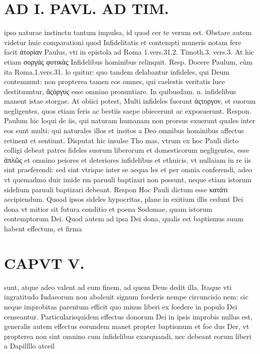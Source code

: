 \documentclass{article}
\begin{document}
\begin{pages}
\section*{AD I. PAVL. AD TIM. }
\marginpar{[ p.268 ]}\pstart ipso naturae instinctu tantum impulsa, id quod cer te verum est. Obstare autem videtur huic comparationi quod Infidelitatis et contempti muneris notam fere facit ἀτορίαν Paulus, vti in epistola ad Roma 1.vers.31.2. Timoth.3. vers.3. At hic etiam σοργάς φυτικὰς Infidelibus hominibus relinquit. Resp. Docere Paulum, cùm ita Roma.1.vers.31. lo quitur: quo tandem delabantur infideles, qui Deum contemnunt: non propterea tamen eos omnes, qui caelestis veritatis luce destituuntur, ἄςόργυς esse omnino pronuntiare. In quibusdam. n. infidelibus manent istae storgae. At obiici potest, Multi infideles fuerunt ἀςτοργον, et suorum negligentes, quos etiam feris ac bestiis saepe obiecerunt ac exposuerunt. Respon. Paulum hic loqui de iis, qui naturam humanam non prorsus exuerunt quales inter eos sunt multi: qui naturales illos et insitos a Deo omnibus hominibus affectus retinent et sentiunt. Disputat hic insulse Tho mas, vtrum ex hoc Pauli dicto colligi debeat patres fideles suorum liberorum et domesticorum negligentes, esse ἀπλῶς et omnino peiores et deteriores infidelibus et ethuicis, vt nullaiam in re iis sint praeferendi: sed sint vtrique inter se aequa les et per omnia conferendi, adeo vt quemadmo duir imide rm paruuli baptizari non possunt, neque etiam istorum sidelium paruuli baptizari debeant. Respon Hoc Pauli dictum esse κατάτι accipiendum. Quoad ipsos sideles hypocritas, plane in exitium illis cedunt Dei dona vt mitior sit futura conditio et poena Sodomae, quam istorum contemptorum Dei. Quod autem ad ipsa Dei dona, qualis est baptismus suum habent effectum, et firma  \pend
\section*{CAPVT  V. }
\marginpar{[ p.269 ]}\pstart sunt, atque adeo valent ad eum finem, ad quem Deus dedit illa. Itaque vti ingratitudo Iudaeorum non aboleuit signum foederis nempe circuncisio nem: sic neque improbitas parentum efficit quo minus liberi ex foedere in populo Dei censeantur. Particularisquidem effectus donorum Dei in ipsis improbis nullus est, generalis autem effectus eorundem manet propter baptismum et foe dus Der, vt propterea non sint omnino cum infidelibus exaequandi, nec debeant eorum liberi a Dapillllo atceil  \pend
{}
{}

\end{pages}
\end{document}

